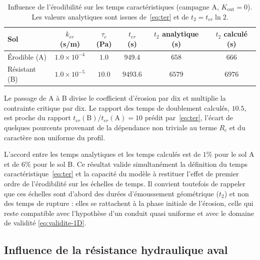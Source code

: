 \documentclass[11pt,a4paper]{report}
\newcommand{\kout}{K_{\mathrm{out}}}
\newcommand{\ter}{{t_{er}}}
\begin{document}
\begin{table}[H]
\centering
\caption{Influence de l'érodibilité sur les temps caractéristiques (campagne A, \(\kout = 0\)). Les
valeurs analytiques sont issues de~\eqref{eq:ter} et de \(t_2 = \ter\ln 2\).}
\label{tab:erodibilite}
\small
\begin{tabular}{lccccc}
\toprule
Sol & \(k_{er}\) (s/m) & \(\tau_c\) (Pa) & \(\ter\) (s) & \(t_2\) analytique (s) & \(t_2\) calculé (s) \\
\midrule
Érodible (A) & \(1.0\times10^{-4}\) & \(1.0\) & \(949.4\) & \(658\) & \(666\) \\
Résistant (B) & \(1.0\times10^{-5}\) & \(10.0\) & \(9493.6\) & \(6579\) & \(6976\) \\
\bottomrule
\end{tabular}
\begin{tablenotes}
\small
\item Le passage de A à B divise le coefficient d'érosion par dix et multiplie la contrainte critique par
dix. Le rapport des temps de doublement calculés, \(10.5\), est proche du rapport
\(\ter(\mathrm{B})/\ter(\mathrm{A}) = 10\) prédit par~\eqref{eq:ter}, l'écart de quelques pourcents
provenant de la dépendance non triviale au terme \(R_c\) et du caractère non uniforme du profil.
\end{tablenotes}
\end{table}

L'accord entre les temps analytiques et les temps calculés est de \(1\%\) pour le sol A et de \(6\%\) pour
le sol B. Ce résultat valide simultanément la définition du temps caractéristique~\eqref{eq:ter} et la
capacité du modèle à restituer l'effet de premier ordre de l'érodibilité sur les échelles de temps. Il
convient toutefois de rappeler que ces échelles sont d'abord des durées d'émoussement géométrique
(\(t_2\)) et non des temps de rupture : elles se rattachent à la phase initiale de l'érosion, celle qui
reste compatible avec l'hypothèse d'un conduit quasi uniforme et avec le domaine de validité
\eqref{eq:validite-1D}.

\subsection{Influence de la résistance hydraulique aval}
\label{sec:kout}
\end{document}
